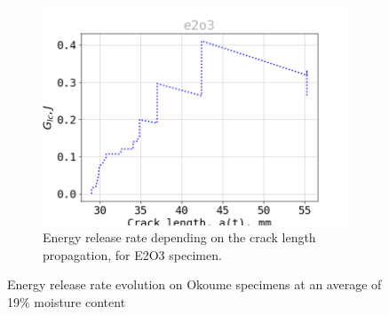 \begin{figure}[H]
\begin{subfigure}{0.48\linewidth}
	\centering
	\includegraphics[scale=0.3]{Figures/e2o3_G}
	\decoRule
	\caption[Energy release rate E2O3]{Energy release rate depending on the crack length propagation, for E2O3 specimen.}
	\label{fig:E2O3_G}
\end{subfigure}
\caption{Energy release rate evolution on Okoume specimens at an average of 19\% moisture content}
\label{E2o_G}
\end{figure}

